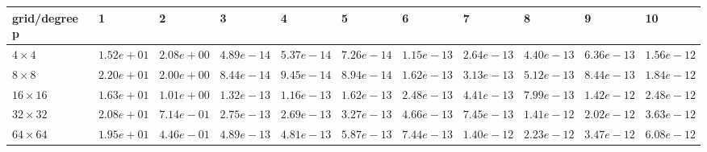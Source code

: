 \begin{tabular}{lllllllllll}
\hline
 grid/degree p   & 1          & 2          & 3          & 4          & 5          & 6          & 7          & 8          & 9          & 10         \\
\hline
 $4 \times 4$    & $1.52e+01$ & $2.08e+00$ & $4.89e-14$ & $5.37e-14$ & $7.26e-14$ & $1.15e-13$ & $2.64e-13$ & $4.40e-13$ & $6.36e-13$ & $1.56e-12$ \\
 $8 \times 8$    & $2.20e+01$ & $2.00e+00$ & $8.44e-14$ & $9.45e-14$ & $8.94e-14$ & $1.62e-13$ & $3.13e-13$ & $5.12e-13$ & $8.44e-13$ & $1.84e-12$ \\
 $16 \times 16$  & $1.63e+01$ & $1.01e+00$ & $1.32e-13$ & $1.16e-13$ & $1.62e-13$ & $2.48e-13$ & $4.41e-13$ & $7.99e-13$ & $1.42e-12$ & $2.48e-12$ \\
 $32 \times 32$  & $2.08e+01$ & $7.14e-01$ & $2.75e-13$ & $2.69e-13$ & $3.27e-13$ & $4.66e-13$ & $7.45e-13$ & $1.41e-12$ & $2.02e-12$ & $3.63e-12$ \\
 $64 \times 64$  & $1.95e+01$ & $4.46e-01$ & $4.89e-13$ & $4.81e-13$ & $5.87e-13$ & $7.44e-13$ & $1.40e-12$ & $2.23e-12$ & $3.47e-12$ & $6.08e-12$ \\
\hline
\end{tabular}